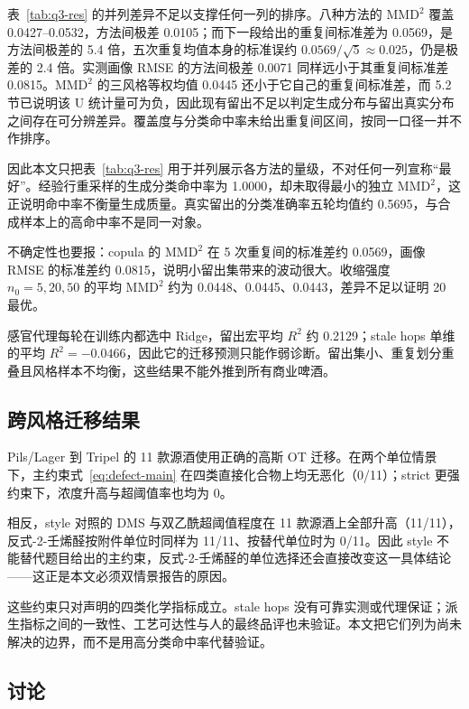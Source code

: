 \documentclass[UTF8,a4paper,zihao=-4]{ctexart}
\numberwithin{figure}{section}
\numberwithin{table}{section}
\numberwithin{equation}{section}
\begin{document}
表~\ref{tab:q3-res} 的并列差异不足以支撑任何一列的排序。八种方法的 $\mathrm{MMD}^{2}$ 覆盖 0.0427--0.0532，方法间极差 0.0105；而下一段给出的重复间标准差为 0.0569，是方法间极差的 5.4 倍，五次重复均值本身的标准误约 $0.0569/\sqrt{5}\approx0.025$，仍是极差的 2.4 倍。实测画像 RMSE 的方法间极差 0.0071 同样远小于其重复间标准差 0.0815。$\mathrm{MMD}^{2}$ 的三风格等权均值 0.0445 还小于它自己的重复间标准差，而 5.2 节已说明该 U 统计量可为负，因此现有留出不足以判定生成分布与留出真实分布之间存在可分辨差异。覆盖度与分类命中率未给出重复间区间，按同一口径一并不作排序。

因此本文只把表~\ref{tab:q3-res} 用于并列展示各方法的量级，不对任何一列宣称“最好”。经验行重采样的生成分类命中率为 1.0000，却未取得最小的独立 $\mathrm{MMD}^{2}$，这正说明命中率不衡量生成质量。真实留出的分类准确率五轮均值约 0.5695，与合成样本上的高命中率不是同一对象。

不确定性也要报：copula 的 $\mathrm{MMD}^{2}$ 在 5 次重复间的标准差约 0.0569，画像 RMSE 的标准差约 0.0815，说明小留出集带来的波动很大。收缩强度 $n_0=5,20,50$ 的平均 $\mathrm{MMD}^{2}$ 约为 0.0448、0.0445、0.0443，差异不足以证明 20 最优。

感官代理每轮在训练内都选中 Ridge，留出宏平均 $R^2$ 约 0.2129；stale hops 单维的平均 $R^2=-0.0466$，因此它的迁移预测只能作弱诊断。留出集小、重复划分重叠且风格样本不均衡，这些结果不能外推到所有商业啤酒。

\subsection{跨风格迁移结果}

Pils/Lager 到 Tripel 的 11 款源酒使用正确的高斯 OT 迁移。在两个单位情景下，主约束式~\eqref{eq:defect-main} 在四类直接化合物上均无恶化（0/11）；strict 更强约束下，浓度升高与超阈值率也均为 0。

相反，style 对照的 DMS 与双乙酰超阈值程度在 11 款源酒上全部升高（11/11），反式-2-壬烯醛按附件单位时同样为 11/11、按替代单位时为 0/11。因此 style 不能替代题目给出的主约束，反式-2-壬烯醛的单位选择还会直接改变这一具体结论——这正是本文必须双情景报告的原因。

这些约束只对声明的四类化学指标成立。stale hops 没有可靠实测或代理保证；派生指标之间的一致性、工艺可达性与人的最终品评也未验证。本文把它们列为尚未解决的边界，而不是用高分类命中率代替验证。

\subsection{讨论}
\end{document}
